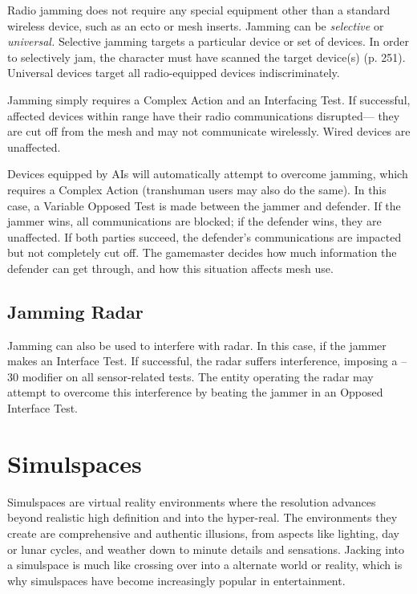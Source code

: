 Radio jamming does not require any special equipment other than a standard wireless device, such as an ecto or mesh inserts. Jamming can be \textit{selective } or \textit{universal.} Selective jamming targets a particular device or set of devices. In order to selectively jam, the character must have scanned the target device(s) (p. 251). Universal devices target all radio-equipped devices indiscriminately. 

Jamming simply requires a Complex Action and an Interfacing Test. If successful, affected devices within range have their radio communications disrupted— they are cut off from the mesh and may not communicate wirelessly. Wired devices are unaffected. 

Devices equipped by AIs will automatically attempt to overcome jamming, which requires a Complex Action (transhuman users may also do the same). In this case, a Variable Opposed Test is made between the jammer and defender. If the jammer wins, all communications are blocked; if the defender wins, they are unaffected. If both parties succeed, the defender's communications are impacted but not completely cut off. The gamemaster decides how much information the defender can get through, and how this situation affects mesh use. 

\subsection{Jamming Radar} 

Jamming can also be used to interfere with radar. In this case, if the jammer makes an Interface Test. If successful, the radar suffers interference, imposing a –30 modifier on all sensor-related tests. The entity operating the radar may attempt to overcome this interference by beating the jammer in an Opposed Interface Test. 

\section{Simulspaces} 

Simulspaces are virtual reality environments where the resolution advances beyond realistic high definition and into the hyper-real. The environments they create are comprehensive and authentic illusions, from aspects like lighting, day or lunar cycles, and weather down to minute details and sensations. Jacking into a simulspace is much like crossing over into a alternate world or reality, which is why simulspaces have become increasingly popular in entertainment. 

